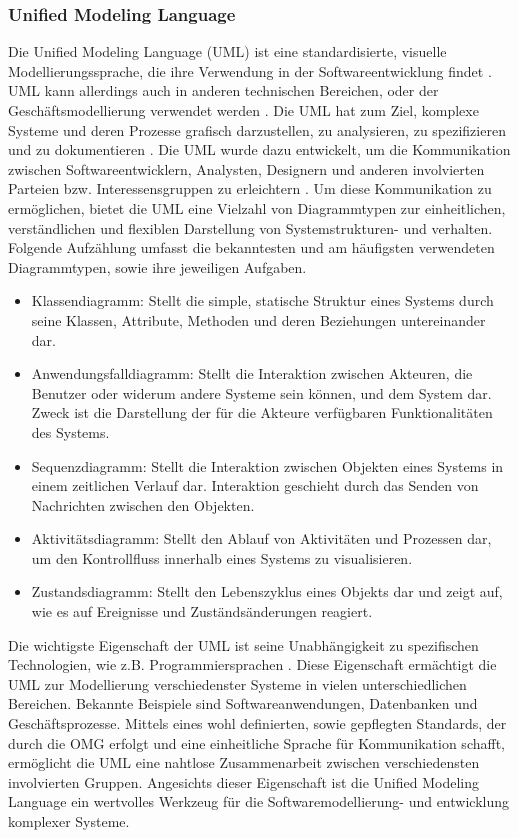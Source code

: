 \subsubsection{Unified Modeling Language}
\label{sec3:model:subsubsec:uml}
Die Unified Modeling Language (UML) \cite{omg-uml} ist eine standardisierte, visuelle Modellierungssprache, die ihre Verwendung in der Softwareentwicklung findet \cite{visual-paradigm-uml}.
UML kann allerdings auch in anderen technischen Bereichen, oder der Geschäftsmodellierung verwendet werden \cite{Kreische2004}.
Die UML hat zum Ziel, komplexe Systeme und deren Prozesse grafisch darzustellen, zu analysieren, zu spezifizieren und zu dokumentieren \cite{visual-paradigm-uml}.
Die UML wurde dazu entwickelt, um die Kommunikation zwischen Softwareentwicklern, Analysten, Designern und anderen involvierten Parteien bzw. Interessensgruppen zu erleichtern \cite{visual-paradigm-uml}.
Um diese Kommunikation zu ermöglichen, bietet die UML eine Vielzahl von Diagrammtypen zur einheitlichen, verständlichen und flexiblen Darstellung von Systemstrukturen- und verhalten.
Folgende Aufzählung umfasst die bekanntesten und am häufigsten verwendeten Diagrammtypen, sowie ihre jeweiligen Aufgaben.
\begin{itemize}
    \item Klassendiagramm: Stellt die simple, statische Struktur eines Systems durch seine Klassen, Attribute, Methoden und deren Beziehungen untereinander dar.
    \item Anwendungsfalldiagramm: Stellt die Interaktion zwischen Akteuren, die Benutzer oder widerum andere Systeme sein können, und dem System dar.
    Zweck ist die Darstellung der für die Akteure verfügbaren Funktionalitäten des Systems.
    \item Sequenzdiagramm: Stellt die Interaktion zwischen Objekten eines Systems in einem zeitlichen Verlauf dar.
    Interaktion geschieht durch das Senden von Nachrichten zwischen den Objekten.
    \item Aktivitätsdiagramm: Stellt den Ablauf von Aktivitäten und Prozessen dar, um den Kontrollfluss innerhalb eines Systems zu visualisieren.
    \item Zustandsdiagramm: Stellt den Lebenszyklus eines Objekts dar und zeigt auf, wie es auf Ereignisse und Zuständsänderungen reagiert.
\end{itemize}
Die wichtigste Eigenschaft der UML ist seine Unabhängigkeit zu spezifischen Technologien, wie z.B. Programmiersprachen \cite{ibm-uml}.
Diese Eigenschaft ermächtigt die UML zur Modellierung verschiedenster Systeme in vielen unterschiedlichen Bereichen.
Bekannte Beispiele sind Softwareanwendungen, Datenbanken und Geschäftsprozesse.
Mittels eines wohl definierten, sowie gepflegten Standards, der durch die OMG \cite{omg} erfolgt und eine einheitliche Sprache für Kommunikation schafft, ermöglicht die UML eine nahtlose Zusammenarbeit zwischen verschiedensten involvierten Gruppen.
Angesichts dieser Eigenschaft ist die Unified Modeling Language ein wertvolles Werkzeug für die Softwaremodellierung- und entwicklung komplexer Systeme.


